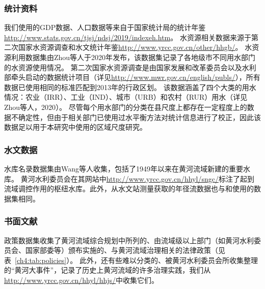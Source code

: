 

\subsubsection*{统计资料}
我们使用的GDP数据、人口数据等来自于国家统计局的统计年鉴\url{http://www.stats.gov.cn/tjsj/ndsj/2019/indexeh.htm}。
水资源相关数据来源于第二次国家水资源调查\cite{zhou2020}和水文统计年鉴\url{http://www.yrcc.gov.cn/other/hhgb/}。
水资源利用数据集由Zhou等人于2020年\cite{zhou2020}发布，该数据集记录了各地级市不同用水部门的水资源使用情况。
第二次国家水资源调查是由国家发展和改革委员会以及水利部牵头启动的数据统计项目（详见\url{http://www.mwr.gov.cn/english/publs/}），所有数据已使用相同的标准匹配到2013年的行政区划。
该数据涵盖了四个大类的用水情况：农业（IRR）、工业（IND）、城市（URB）和农村（RUR）用水（详见Zhou等人，2020\cite{zhou2020}）。
尽管每个用水部门的分类在县尺度上都存在一定程度上的数据不确定性，但由于相关部门已使用过水平衡方法对统计信息进行了校正，因此该数据足以用于本研究中使用的区域尺度研究。

\subsubsection*{水文数据}
水库名录数据集由Wang等人\cite{wang2019c}收集，包括了1949年以来在黄河流域新建的重要水库。
黄河水利委员会在其网站中\url{http://www.yrcc.gov.cn/hhyl/sngc/}标注了起到流域调控作用的枢纽水库。此外，从水文站测量获取的年径流数据也与\cite{wang2019c}和\cite{wang2016e}使用的数据集相同。

\subsubsection*{书面文献}

政策数据集收集了黄河流域综合规划中所列的、由流域级以上部门（如黄河水利委员会、国家部委等）颁布实施的、与黄河流域治理相关的法律政策\cite{shuilibuhuangheshuiliweiyuanhui}（见表~\ref{ch4:tab:policies}）。
此外，还有些难以分类的、被黄河水利委员会所收集整理的“黄河大事件”，记录了历史上黄河流域的许多治理实践，我们从\url{http://www.yrcc.gov.cn/hhyl/hhjs/}中收集它们。


